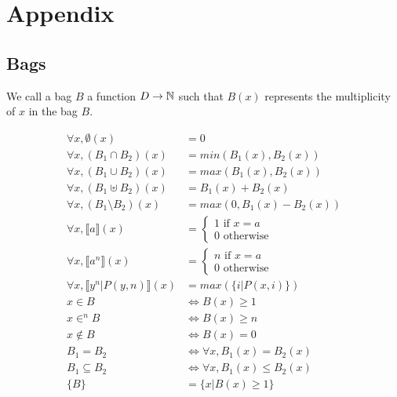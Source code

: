 \clearpage
\appendix
\section{Appendix}
\subsection{Bags}

\begin{mydef}
	We call a bag $B$ a function $D \rightarrow \mathbb{N}$ such that $B(x)$ represents the multiplicity of $x$ in the bag $B$.  
\end{mydef}

\begin{mydef}
	\begin{align*}
		\forall x, \emptyset(x)  & = 0 \\
		\forall x, (B_1 \cap B_2)(x)  & = min(B_1(x),B_2(x)) \\
		\forall x, (B_1 \cup B_2)(x)  & = max(B_1(x),B_2(x)) \\
		\forall x, (B_1 \uplus B_2)(x)  & = B_1(x) + B_2(x) \\
		\forall x, (B_1 \setminus B_2)(x)  & = max(0,B_1(x) - B_2(x)) \\
		\forall x, \llbracket a \rrbracket(x) & = \left\{\begin{array}{ll}
			1 \mbox{ if } x = a \\
			0 \mbox{ otherwise}
		\end{array}\right. \\
		\forall x, \llbracket a^n \rrbracket(x) & = \left\{\begin{array}{ll}
			n \mbox{ if } x = a \\
			0 \mbox{ otherwise}
		\end{array}\right. \\
		\forall x, \llbracket y^n | P(y,n) \rrbracket(x)  & = max(\{ i | P(x,i) \}) \\
		x \in B & \iff B(x) \geq 1 \\
		x \in^n B & \iff B(x) \geq n \\
		x \notin B & \iff B(x) = 0 \\
		B_1 = B_2 &  \iff \forall x, B_1(x) = B_2(x) \\
		B_1 \subseteq B_2 &  \iff \forall x, B_1(x) \leq B_2(x) \\
		\{B\}  & = \{x | B(x) \geq 1\} \\
	\end{align*}
\end{mydef}

